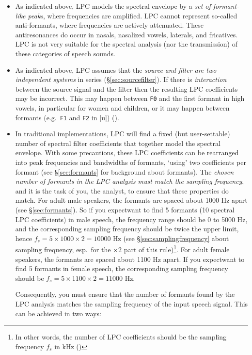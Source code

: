 \documentclass[
]{book}
\begin{document}
\begin{itemize}
\item
  As indicated above, LPC models the spectral envelope by a \emph{set of formant-like peaks}, where frequencies are amplified. LPC cannot represent so-called anti-formants, where frequencies are actively attenuated. These antiresonances do occur in nasals, nasalized vowels, laterals, and fricatives. LPC is not very suitable for the spectral analysis (nor the transmission) of these categories of speech sounds.
\item
  As indicated above, LPC assumes that the \emph{source and filter are two independent systems} in series (§\ref{sec:sourcefilter}).
  If there is \emph{interaction} between the source signal and the filter then the resulting LPC coefficients may be incorrect. This may happen between \texttt{F0} and the first formant in high vowels, in particular for women and children, or it may happen between formants (e.g.~\texttt{F1} and \texttt{F2} in {[}u{]}) (\citet{Titze_2008}).
\item
  In traditional implementations, LPC will find a fixed (but user-settable) number of spectral filter coefficients that together model the spectral envelope. With some precautions, these LPC coefficients can be rearranged into peak frequencies and bandwidths of formants, `using' two coefficients per formant (see §\ref{sec:formants} for background about formants).
  The \emph{chosen number of formants in the LPC analysis must match the sampling frequency}, and it is the task of you, the analyst, to ensure that these properties do match.
  For adult male speakers, the formants are spaced about 1000 Hz apart (see §\ref{sec:formants}). So if you expect\textbar want to find 5 formants (10 spectral LPC coefficients) in male speech, the frequency range should be 0 to 5000 Hz, and the corresponding sampling frequency should be twice the upper limit, hence \(f_s = 5 \times 1000 \times 2 = 10000\) Hz (see §\ref{sec:samplingfrequency} about sampling frequency, esp.~for the \(\times 2\) part of this rule)\footnote{In other words, the number of LPC coefficients should be the sampling frequency \(f_s\) in kHz (\citet{Story_2026})}.
  For adult female speakers, the formants are spaced about 1100 Hz apart. If you expect\textbar want to find 5 formants in female speech, the corresponding sampling frequency should be \(f_s = 5 \times 1100 \times 2 = 11000\) Hz.

  Consequently, you must ensure that the number of formants found by the LPC analysis matches the sampling frequency of the input speech signal. This can be achieved in two ways:


\end{itemize}
\end{document}
